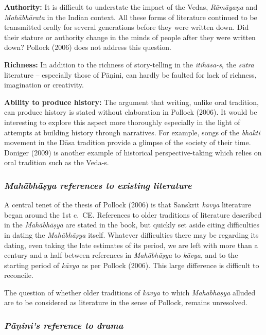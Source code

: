 {\bf Authority:} It is difficult to understate the impact of the Vedas, {\sl Rāmāyaṇa} and {\sl Mahābhārata} in the Indian context. All these forms of literature continued to be transmitted orally for several generations before they were written down. Did their stature or authority change in the minds of people after they were written down?  Pollock (2006) does not address this question.

{\bf Richness:} In addition to the richness of story-telling in the {\sl itihāsa-s}, the {\sl sūtra} literature – especially those of Pāṇini, can hardly be faulted for lack of richness, imagination or creativity.

{\bf Ability to produce history:} The argument that writing, unlike oral tradition, can produce history is stated without elaboration in Pollock (2006). It would be interesting to explore this aspect more thoroughly especially in the light of attempts at building history through narratives. For example, songs of the {\sl bhakti} movement in the Dāsa tradition provide a glimpse of the society of their time. Doniger (2009) is another example of historical perspective-taking which relies on oral tradition such as the Veda-s.
\newpage

\subsubsection{{\sl Mahābhāṣya references to existing literature}}

A central tenet of the thesis of Pollock (2006) is that Sanskrit {\sl kāvya} literature began around the 1st c.\ CE. References to older traditions of literature described in the {\sl Mahābhāṣya} are stated in the book, but quickly set aside citing difficulties in dating the {\sl Mahābhāṣya} itself. Whatever difficulties there may be regarding its dating, even taking the late estimates of its period, we are left with more than a century and a half between references in {\sl Mahābhāṣya} to {\sl kāvya}, and to the starting period of {\sl kāvya} as per Pollock (2006). This large difference is difficult to reconcile. 

The question of whether older traditions of {\sl kāvya} to which {\sl Mahābhāṣya} alluded are to be considered as literature in the sense of Pollock, remains unresolved.

\subsubsection{{\sl Pāṇini’s reference to drama}}

